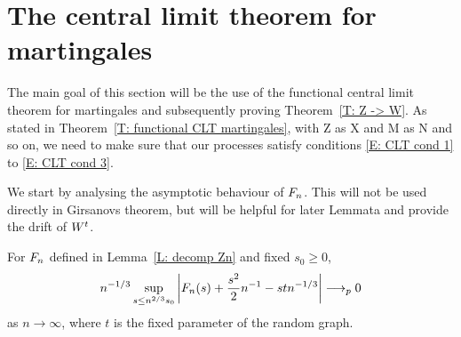 \section{The central limit theorem for martingales}

The main goal of this section will be the use of the functional central limit theorem for martingales
and subsequently proving Theorem~\ref{T: Z -> W}.
As stated in Theorem~\ref{T: functional CLT martingales}, with Z as X and M as N and so on,
we need to make sure that our processes satisfy conditions \eqref{E: CLT cond 1} to \eqref{E: CLT cond 3}.

We start by analysing the asymptotic behaviour of $F_n$.
This will not be used directly in Girsanovs theorem, 
but will be helpful for later Lemmata and provide the drift of $W^t$.


\begin{lemma} \label{L: limit An}
	For $F_n$ defined in Lemma~\ref{L: decomp Zn} and fixed $s_0 \geq 0$,
	\begin{equation} \label{E: limit An}
	n^{-1 / 3} \sup_{s \leq n^{2 / 3} s_0 } \left| F_n(s) + \frac{s^2}{2}n^{-1} - stn^{-1 / 3} \right| \longrightarrow_p 0
	\end{equation}
	as $n \rightarrow \infty$, where $t$ is the fixed parameter of the random graph.
\end{lemma}

